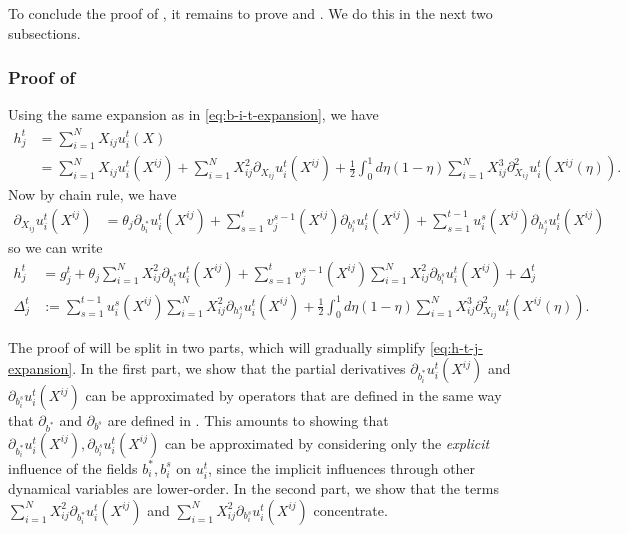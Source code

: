\documentclass{article}
\newcommand{\1}{\mathbbm{1}}
\theoremstyle{plain}
\theoremstyle{definition}
\theoremstyle{remark}
\begin{document}
To conclude the proof of , it remains to prove  and . We do this in the next two subsections.

\subsubsection{Proof of }
    Using the same expansion as in \eqref{eq:b-i-t-expansion}, we have 
    \begin{align*}
        h_j^t &= \sum_{i=1}^N X_{ij}u_i^{t}(X)\nonumber \\
    &= \sum_{i=1}^N X_{ij}u_i^{t}(X^{ij}) +  \sum_{i=1}^N X_{ij}^2\partial_{X_{ij}}u_i^{t}(X^{ij}) +\frac{1}{2} \int_0^1 d\eta(1-\eta) \sum_{i=1}^N X_{ij}^3 \partial^2_{X_{ij}}u_i^{t}(X^{ij}(\eta)).
\end{align*}
Now by chain rule, we have 
\begin{align*}
    \partial_{X_{ij}}u_i^{t}  (X^{ij}) &= \theta_j\partial_{b_i^*}u_i^{t}  (X^{ij}) + \sum_{s=1}^t v^{s-1}_j(X^{ij})\partial_{b_i^s}u_i^{t}  (X^{ij})  + \sum_{s=1}^{t-1} u^{s}_i(X^{ij})\partial_{h_j^s}u_i^{t}  (X^{ij})
\end{align*}
so we can write 
\begin{align}
    h_j^t &= g_j^t + \theta_j\sum_{i=1}^N X_{ij}^2\partial_{b_i^*}u_i^{t}  (X^{ij}) + \sum_{s=1}^t v^{s-1}_j(X^{ij})\sum_{i=1}^N X_{ij}^2\partial_{b_i^s}u_i^{t}  (X^{ij}) + \Delta^t_j\label{eq:h-t-j-expansion} \\
    \Delta^t_j &:= \sum_{s=1}^{t-1} u^{s}_i(X^{ij})\sum_{i=1}^N X_{ij}^2\partial_{h_j^s}u_i^{t}  (X^{ij}) + \frac{1}{2} \int_0^1 d\eta(1-\eta) \sum_{i=1}^N X_{ij}^3 \partial^2_{X_{ij}}u_i^{t}(X^{ij}(\eta)).\nonumber
\end{align}

The proof of  will be split in two parts, which will gradually simplify \eqref{eq:h-t-j-expansion}. In the first part, we show that the partial derivatives $\partial_{b_i^*}u_i^{t}  (X^{ij})$ and $\partial_{b_i^s}u_i^{t}  (X^{ij})$ can be approximated by operators that are defined in the same way that $\partial_{b^*}$ and $\partial_{b^s}$ are defined in . This amounts to showing that $\partial_{b_i^*}u_i^{t}  (X^{ij}), \partial_{b_i^s}u_i^{t}  (X^{ij})$ can be approximated by considering only the \emph{explicit} influence of the fields $b_i^*, b_i^s$ on $u_i^t$, since the implicit influences through other dynamical variables are lower-order. In the second part, we show that the terms $\sum_{i=1}^N X_{ij}^2\partial_{b_i^*}u_i^{t}  (X^{ij})$ and $\sum_{i=1}^N X_{ij}^2\partial_{b_i^s}u_i^{t}  (X^{ij})$ concentrate. 
\end{document}
